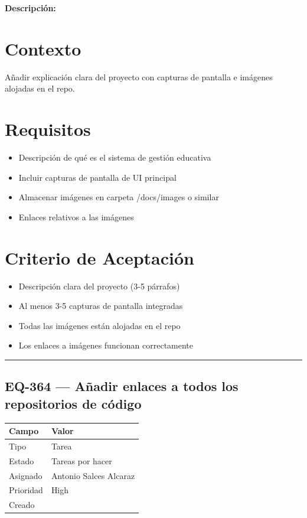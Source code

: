\documentclass[
  spanish,
  11pt,
]{report}
\newcounter{none} %
\providecommand{\tightlist}{%
  \setlength{\itemsep}{0pt}\setlength{\parskip}{0pt}}
\begin{document}
\textbf{Descripción:}

\section{Contexto}\label{contexto-1}

Añadir explicación clara del proyecto con capturas de pantalla e
imágenes alojadas en el repo.

\section{Requisitos}\label{requisitos}

\begin{itemize}
\tightlist
\item
  Descripción de qué es el sistema de gestión educativa
\item
  Incluir capturas de pantalla de UI principal
\item
  Almacenar imágenes en carpeta /docs/images o similar
\item
  Enlaces relativos a las imágenes
\end{itemize}

\section{Criterio de Aceptación}\label{criterio-de-aceptaciuxf3n}

\begin{itemize}
\tightlist
\item[$\square$]
  Descripción clara del proyecto (3-5 párrafos)
\item[$\square$]
  Al menos 3-5 capturas de pantalla integradas
\item[$\square$]
  Todas las imágenes están alojadas en el repo
\item[$\square$]
  Los enlaces a imágenes funcionan correctamente
\end{itemize}

\begin{center}\rule{0.5\linewidth}{0.5pt}\end{center}

\subsection{EQ-364 --- Añadir enlaces a todos los repositorios de
código}\label{eq-364-auxf1adir-enlaces-a-todos-los-repositorios-de-cuxf3digo}

{\def\LTcaptype{none} %
\begin{longtable}[]{@{}ll@{}}
\toprule\noalign{}
Campo & Valor \\
\midrule\noalign{}
\endhead
\bottomrule\noalign{}
\endlastfoot
Tipo & Tarea \\
Estado & Tareas por hacer \\
Asignado & Antonio Salces Alcaraz \\
Prioridad & High \\
Creado & \\
\end{longtable}
}
\end{document}
